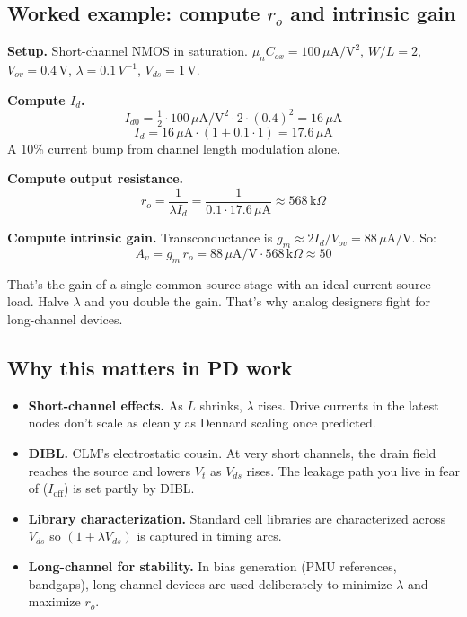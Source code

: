 \documentclass[11pt]{article}
\begin{document}
\subsection{Worked example: compute $r_o$ and intrinsic gain}

\textbf{Setup.} Short-channel NMOS in saturation. $\mu_n C_{ox} = 100\,\mu\text{A}/\text{V}^2$, $W/L = 2$, $V_{ov} = 0.4\,\text{V}$, $\lambda = 0.1\,V^{-1}$, $V_{ds} = 1\,\text{V}$.

\textbf{Compute $I_d$.}
\[
I_{d0} = \tfrac{1}{2}\cdot 100\,\mu\text{A}/\text{V}^2 \cdot 2 \cdot (0.4)^2 = 16\,\mu\text{A}
\]
\[
I_d = 16\,\mu\text{A}\cdot(1 + 0.1\cdot 1) = 17.6\,\mu\text{A}
\]
A 10\% current bump from channel length modulation alone.

\textbf{Compute output resistance.}
\[
r_o = \frac{1}{\lambda I_d} = \frac{1}{0.1\cdot 17.6\,\mu\text{A}} \approx 568\,\text{k}\Omega
\]

\textbf{Compute intrinsic gain.} Transconductance is $g_m \approx 2I_d / V_{ov} = 88\,\mu\text{A/V}$. So:
\[
A_v = g_m\, r_o = 88\,\mu\text{A/V} \cdot 568\,\text{k}\Omega \approx 50
\]

That's the gain of a single common-source stage with an ideal current source load. Halve $\lambda$ and you double the gain. That's why analog designers fight for long-channel devices.

\subsection{Why this matters in PD work}

\begin{itemize}
\item \textbf{Short-channel effects.} As $L$ shrinks, $\lambda$ rises. Drive currents in the latest nodes don't scale as cleanly as Dennard scaling once predicted.
\item \textbf{DIBL.} CLM's electrostatic cousin. At very short channels, the drain field reaches the source and lowers $V_t$ as $V_{ds}$ rises. The leakage path you live in fear of ($I_{\text{off}}$) is set partly by DIBL.
\item \textbf{Library characterization.} Standard cell libraries are characterized across $V_{ds}$ so $(1 + \lambda V_{ds})$ is captured in timing arcs.
\item \textbf{Long-channel for stability.} In bias generation (PMU references, bandgaps), long-channel devices are used deliberately to minimize $\lambda$ and maximize $r_o$.
\end{itemize}
\end{document}
